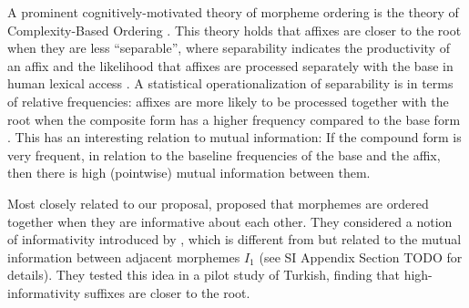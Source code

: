 \documentclass[11pt,letterpaper]{article}
\newcommand{\citep}{\parencite}
\newcommand{\citet}{\Textcite}
\newcounter{def}
\begin{document}
A prominent cognitively-motivated theory of morpheme ordering is the theory of Complexity-Based Ordering \citep{hay2002speech,plag2002the,hay2004what,hay2005shifting,plag2009suffix}.
This theory holds that affixes are closer to the root when they are less ``separable'', where separability indicates the productivity of an affix and the likelihood that affixes are processed separately with the base in human lexical access  \citep{baayen1993on}.
A statistical operationalization of separability is in terms of relative frequencies:
affixes are more likely to be processed together with the root when the composite form has a higher frequency compared to the base form \citep{hay2001lexical}. %
This has an interesting relation to mutual information: 
If the compound form is very frequent, in relation to the baseline frequencies of the base and the affix, then there is high (pointwise) mutual information between them.

Most closely related to our proposal, \citet{inkelas2016affix} proposed that morphemes are ordered together when they are informative about each other.
They considered a notion of informativity introduced by \citet{priva2017informativity}, which is different from but related to the mutual information between adjacent morphemes $I_1$ (see SI Appendix Section TODO for details).
They tested this idea in a pilot study of Turkish, finding that high-informativity suffixes are closer to the root.
\end{document}
